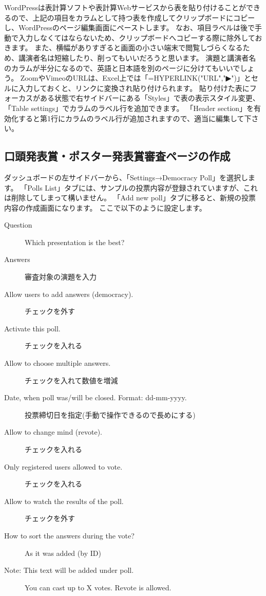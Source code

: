 \documentclass[titlepage,10pt,a4paper,uplatex]{jsbook}
\begin{document}
WordPressは表計算ソフトや表計算Webサービスから表を貼り付けることができるので、上記の項目をカラムとして持つ表を作成してクリップボードにコピーし、WordPressのページ編集画面にペーストします。
なお、項目ラベルは後で手動で入力しなくてはならないため、クリップボードへコピーする際に除外しておきます。
また、横幅がありすぎると画面の小さい端末で閲覧しづらくなるため、講演者名は短縮したり、削ってもいいだろうと思います。
演題と講演者名のカラムが半分になるので、英語と日本語を別のページに分けてもいいでしょう。
ZoomやVimeoのURLは、Excel上では「=HYPERLINK("URL","▶")」とセルに入力しておくと、リンクに変換され貼り付けられます。
貼り付けた表にフォーカスがある状態で右サイドバーにある「Styles」で表の表示スタイル変更、「Table settings」でカラムのラベル行を追加できます。
「Header section」を有効化すると第1行にカラムのラベル行が追加されますので、適当に編集して下さい。

\subsection{口頭発表賞・ポスター発表賞審査ページの作成}

ダッシュボードの左サイドバーから、「Settings→Democracy Poll」を選択します。
「Polls List」タブには、サンプルの投票内容が登録されていますが、これは削除してしまって構いません。
「Add new poll」タブに移ると、新規の投票内容の作成画面になります。
ここで以下のように設定します。

\begin{description}
\item[Question] Which presentation is the best?
\item[Answers] 審査対象の演題を入力
\item[Allow users to add answers (democracy).] チェックを外す
\item[Activate this poll.] チェックを入れる
\item[Allow to choose multiple answers.] チェックを入れて数値を増減
\item[Date, when poll was/will be closed. Format: dd-mm-yyyy.] 投票締切日を指定(手動で操作できるので長めにする)
\item[Allow to change mind (revote).] チェックを入れる
\item[Only registered users allowed to vote.] チェックを入れる
\item[Allow to watch the results of the poll.] チェックを外す
\item[How to sort the answers during the vote?] As it was added (by ID)
\item[Note: This text will be added under poll.] You can cast up to X votes. Revote is allowed.
\end{description}
\end{document}
